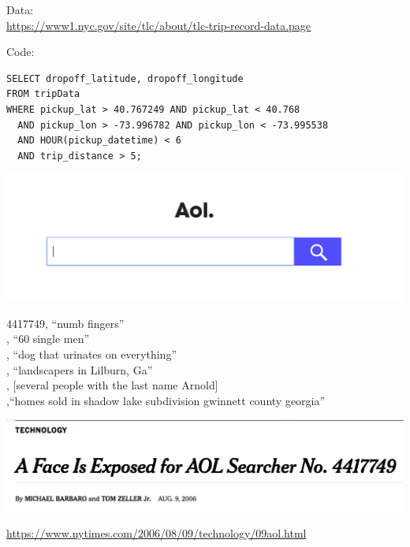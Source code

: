 \documentclass{beamer}
\begin{document}
\begin{frame}[fragile]

Data:\\
\url{https://www1.nyc.gov/site/tlc/about/tlc-trip-record-data.page}
\pause

\vfill
Code:\\
\begin{tiny}
\begin{lstlisting} 
SELECT dropoff_latitude, dropoff_longitude
FROM tripData
WHERE pickup_lat > 40.767249 AND pickup_lat < 40.768
  AND pickup_lon > -73.996782 AND pickup_lon < -73.995538
  AND HOUR(pickup_datetime) < 6
  AND trip_distance > 5;
\end{lstlisting}
\end{tiny}

\end{frame}
\begin{frame}

\begin{center}
\includegraphics[width=\textwidth]{figures/aol_search}
\end{center}

\end{frame}
\begin{frame}

4417749, ``numb fingers'' \\ , ``60 single men'' \\ , ``dog that urinates on everything'' \\ , ``landscapers in Lilburn, Ga'' \\ ,  [several people with the last name Arnold] \\ ,``homes sold in shadow lake subdivision gwinnett county georgia''\\

\end{frame}
\begin{frame}

\begin{center}
\includegraphics[width=\textwidth]{figures/barbaro_face_2006_title}
\end{center}

\vfill

\tiny{\url{https://www.nytimes.com/2006/08/09/technology/09aol.html}}

\end{frame}
\end{document}

